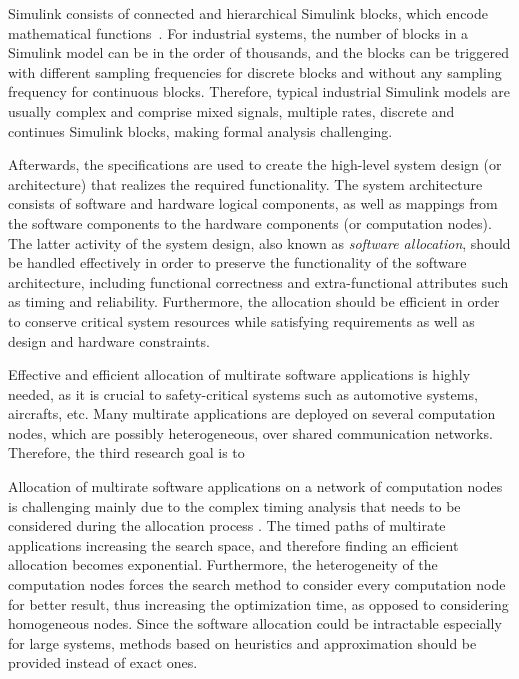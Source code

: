 Simulink consists of connected and hierarchical Simulink blocks, which encode mathematical functions~\cite{JamesB.Dabney2003MasteringSimulink}. For industrial systems, the number of blocks in a Simulink model can be in the order of thousands, and the blocks can be triggered with different sampling frequencies for discrete blocks and without any sampling frequency 
for continuous blocks. Therefore, typical industrial Simulink models are usually complex and comprise mixed signals, multiple rates, discrete and continues Simulink blocks, making formal analysis challenging.

Afterwards, the specifications are used to create the high-level system design (or architecture) that realizes the required functionality. The system architecture consists of software and hardware logical components, as well as mappings from the software components to the hardware components (or computation nodes). The latter activity of the system design, also known as \textit{software allocation}, should be handled effectively in order to preserve the functionality of the software architecture, including functional correctness and extra-functional attributes such as timing and reliability. Furthermore, the allocation should be efficient in order to conserve critical system resources while satisfying requirements as well as design and hardware constraints.

Effective and efficient allocation of multirate software applications is highly needed, as it is crucial to safety-critical systems such as automotive systems, aircrafts, etc. Many multirate applications are deployed on several computation nodes, which are possibly heterogeneous, over shared communication networks. Therefore, the third research goal is to
\begin{researchgoal}
\end{researchgoal}

Allocation of multirate software applications on a network of computation nodes is challenging mainly due to the complex timing analysis that needs to be considered during the allocation process \cite{Mahmud5222, mubeen2013support}. The timed paths of multirate applications increasing the search space, and therefore finding an efficient allocation becomes exponential. Furthermore, the heterogeneity of the computation nodes forces the search method to consider every computation node for better result, thus increasing the optimization time, as opposed to considering homogeneous nodes. Since the software allocation could be intractable especially for large systems, methods based on heuristics and approximation should be provided instead of exact ones.


